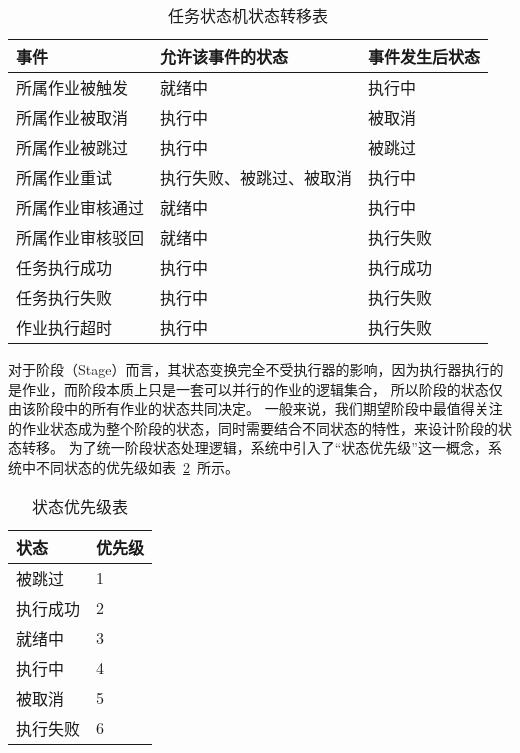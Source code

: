 \begin{table}[h]
  \centering
  \caption{任务状态机状态转移表}
  \label{tab:任务状态机状态转移表}
  \begin{tabular}{lll}
    \toprule
    事件           & 允许该事件的状态          & 事件发生后状态                  \\
    \midrule
    所属作业被触发           & 就绪中                   & 执行中       \\
    所属作业被取消           & 执行中                   & 被取消       \\
    所属作业被跳过           & 执行中                   & 被跳过       \\
    所属作业重试            & 执行失败、被跳过、被取消   & 执行中       \\
    所属作业审核通过        & 就绪中                   & 执行中        \\
    所属作业审核驳回        & 就绪中                   & 执行失败       \\
    任务执行成功            & 执行中      & 执行成功   \\
    任务执行失败            & 执行中      & 执行失败   \\
    作业执行超时            & 执行中      & 执行失败   \\
    \bottomrule
  \end{tabular}
\end{table}

对于阶段（Stage）而言，其状态变换完全不受执行器的影响，因为执行器执行的是作业，而阶段本质上只是一套可以并行的作业的逻辑集合，
所以阶段的状态仅由该阶段中的所有作业的状态共同决定。
一般来说，我们期望阶段中最值得关注的作业状态成为整个阶段的状态，同时需要结合不同状态的特性，来设计阶段的状态转移。
为了统一阶段状态处理逻辑，系统中引入了“状态优先级”这一概念，系统中不同状态的优先级如表~\ref{tab:状态优先级表}~所示。

\begin{table}[h]
  \centering
  \caption{状态优先级表}
  \label{tab:状态优先级表}
  \begin{tabular}{ll}
    \toprule
    状态           & 优先级                                     \\
    \midrule
    被跳过         & 1         \\
    执行成功       & 2         \\
    就绪中         & 3         \\
    执行中         & 4         \\
    被取消         & 5         \\
    执行失败       & 6         \\
    \bottomrule
  \end{tabular}
\end{table}

